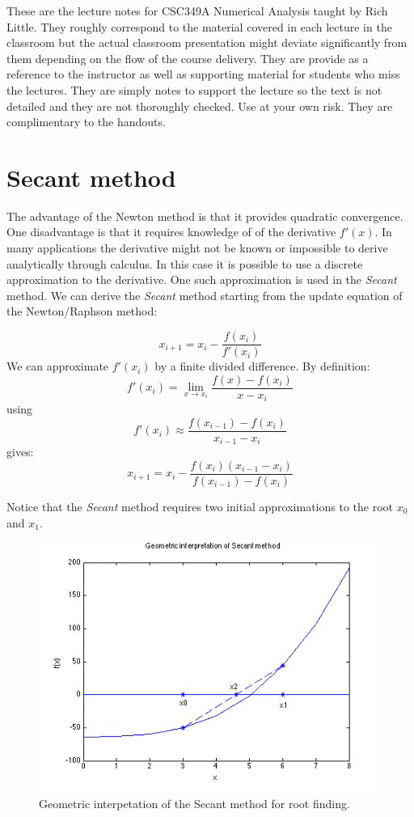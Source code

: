 \documentclass [titlepage,12pt,letter] {article}
\begin{document}
 


These are the lecture notes for CSC349A Numerical Analysis taught by
Rich Little. They roughly correspond to
the material covered in each lecture in the classroom but the actual
classroom presentation might deviate significantly from them depending
on the flow of the course delivery. They are provide as a reference to
the instructor as well as supporting material for students who miss
the lectures. They are simply notes to support the lecture so the text
is not detailed and they are not thoroughly checked. Use at your own
risk. They are complimentary to the handouts.

\section{Secant method} 

The advantage of the Newton method is that it provides quadratic
convergence. One disadvantage is that it requires knowledge of of the
derivative $f'(x)$. In many applications the derivative might not be
known or impossible to derive analytically through calculus. In this
case it is possible to use a discrete approximation to the
derivative. One such approximation is used in the {\it Secant}
method. We can derive the {\it Secant} method starting from the update
equation of the Newton/Raphson method: 


\[
x_{i+1} = x_i - \frac{f(x_i)}{f'(x_i)}
\]
\noindent 
We can approximate $f'(x_i)$ by a finite divided difference. By
definition: 
\[
f'(x_i) = \lim_{x \rightarrow x_i} \frac{f(x)-f(x_i)}{x-x_i} 
\]
\noindent 
using 
\[
f'(x_i) \approx \frac{f(x_{i-1})-f(x_i)}{x_{i-1} - x_i}
\]
\noindent 
gives: 
\[
x_{i+1} = x_i - \frac{f(x_i)(x_{i-1}-x_i)}{f(x_{i-1}) - f(x_{i})}
\]

Notice that the {\it Secant} method requires two initial
approximations to the root $x_0$ and $x_1$. 

\newpage
\begin{figure} 
  \centering
  \includegraphics[scale=0.75]{secant}
  \caption{Geometric interpetation of the Secant method for
    root finding.}
  \label{fig:newton}
\end{figure}
\end{document}
